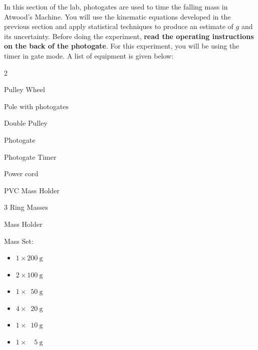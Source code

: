 \documentclass[addpoints]{physlabs}
\begin{document}
\begin{labsection}
\begin{experiment}
In this section of the lab, photogates are used to time the falling mass in Atwood's Machine. You will use the kinematic equations developed in the previous section and apply statistical techniques to produce an estimate of $g$ and its uncertainty. Before doing the experiment, \textbf{read the operating instructions on the back of the photogate}. For this experiment, you will be using the timer in gate mode. A list of equipment is given below:
%
\begin{multicols}{2}
\begin{todolist}
    \item Pulley Wheel
    \item Pole with photogates
    \item Double Pulley
    \item Photogate
    \item Photogate Timer
    \item Power cord
    \item PVC Mass Holder
    \item 3 Ring Masses
    \item Mass Holder
    \item Mass Set:
          \begin{itemize}[itemsep=0em]
              \item $1\times\qty{200}{\gram}$
              \item $2\times\qty{100}{\gram}$
              \item $1\times\phantom{0}\qty{50}{\gram}$
              \item $4\times\phantom{0}\qty{20}{\gram}$
              \item $1\times\phantom{0}\qty{10}{\gram}$
              \item $1\times\phantom{00}\qty{5}{\gram}$
          \end{itemize}
\end{todolist}
\end{multicols}


\end{experiment}
\end{labsection}
\end{document}
